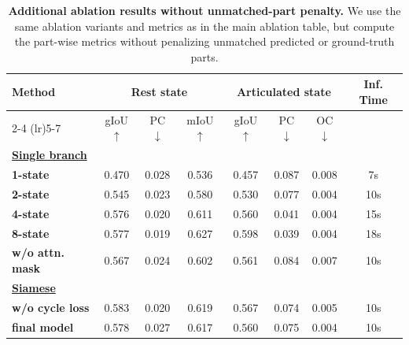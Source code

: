\begin{table}[!htbp]
    \centering
    \caption{\textbf{Additional ablation results without unmatched-part penalty.}
    We use the same ablation variants and metrics as in the main ablation table, but compute the part-wise metrics without penalizing unmatched predicted or ground-truth parts.}
    \label{tab:supp-ablation-without-penalty}
    \renewcommand{\arraystretch}{1.2}

    \begin{tabular*}{\linewidth}{@{\extracolsep{\fill}} l ccc ccc c @{}}
        \toprule
        \multirow{2}{*}{\textbf{Method}}
        & \multicolumn{3}{c}{\textbf{Rest state}}
        & \multicolumn{3}{c}{\textbf{Articulated state}}
        & \multirow{2}{*}{\textbf{Inf. Time}} \\
        \cmidrule(lr){2-4} \cmidrule(lr){5-7}
        & gIoU$\uparrow$ & PC$\downarrow$ & mIoU$\uparrow$
        & gIoU$\uparrow$ & PC$\downarrow$ & OC$\downarrow$
        & \\
        \midrule

        \multicolumn{8}{l}{\underline{\textbf{Single branch}}} \\
        \textbf{1-state}
        & 0.470 & 0.028 & 0.536 & 0.457 & 0.087 & 0.008 & 7s \\

        \textbf{2-state}
        & 0.545 & 0.023 & 0.580 & 0.530 & 0.077 & 0.004 & 10s \\
        
        \textbf{4-state}
        & {0.576} & {0.020} & {0.611} & {0.560} & {0.041} & {0.004} & {15s} \\

        \textbf{8-state}     
        & {0.577} & {0.019} & {0.627} & {0.598} & {0.039} & {0.004} & {18s} \\

        \textbf{w/o attn. mask}
        & 0.567 & 0.024 & 0.602 & 0.561 & 0.084 & 0.007 & 10s \\

        \midrule
        \multicolumn{8}{l}{\underline{\textbf{Siamese}}} \\

        \textbf{w/o cycle loss}
        & 0.583 & 0.020 & 0.619 & 0.567 & 0.074 & 0.005 & 10s \\

        \textbf{final model}
        & 0.578 & 0.027 & 0.617 & 0.560 & 0.075 & 0.004 & 10s \\

        \bottomrule
    \end{tabular*}
\end{table}


